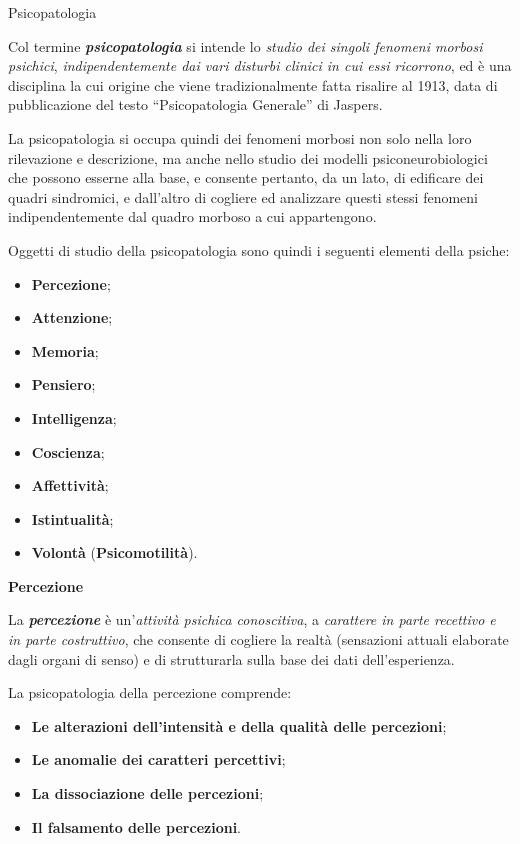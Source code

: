 \documentclass[]{article}
\date{}
\begin{document}
Psicopatologia

Col termine \textbf{\emph{psicopatologia}} si intende lo \emph{studio
dei singoli fenomeni morbosi psichici}, \emph{indipendentemente dai vari
disturbi clinici in cui essi ricorrono}, ed è una disciplina la cui
origine che viene tradizionalmente fatta risalire al 1913, data di
pubblicazione del testo ``Psicopatologia Generale'' di Jaspers.

La psicopatologia si occupa quindi dei fenomeni morbosi non solo nella
loro rilevazione e descrizione, ma anche nello studio dei modelli
psiconeurobiologici che possono esserne alla base, e consente pertanto,
da un lato, di edificare dei quadri sindromici, e dall'altro di cogliere
ed analizzare questi stessi fenomeni indipendentemente dal quadro
morboso a cui appartengono.

Oggetti di studio della psicopatologia sono quindi i seguenti elementi
della psiche:

\begin{itemize}
\item
  \textbf{Percezione};
\item
  \textbf{Attenzione};
\item
  \textbf{Memoria};
\item
  \textbf{Pensiero};
\item
  \textbf{Intelligenza};
\item
  \textbf{Coscienza};
\item
  \textbf{Affettività};
\item
  \textbf{Istintualità};
\item
  \textbf{Volontà} (\textbf{Psicomotilità}).
\end{itemize}

\textbf{Percezione}

La \textbf{\emph{percezione}} è un'\emph{attività psichica conoscitiva},
a \emph{carattere in parte recettivo e in parte costruttivo}, che
consente di cogliere la realtà (sensazioni attuali elaborate dagli
organi di senso) e di strutturarla sulla base dei dati dell'esperienza.

La psicopatologia della percezione comprende:

\begin{itemize}
\item
  \textbf{Le alterazioni dell'intensità e della qualità delle
  percezioni};
\item
  \textbf{Le anomalie dei caratteri percettivi};
\item
  \textbf{La dissociazione delle percezioni};
\item
  \textbf{Il falsamento delle percezioni}.
\end{itemize}
\end{document}
